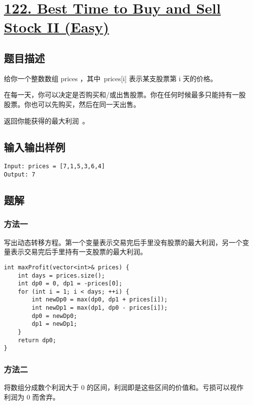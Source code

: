 \documentclass[lang=cn,10pt]{elegantbook}
\begin{document}
{\color{red}\section{\href{https://leetcode.cn/problems/best-time-to-buy-and-sell-stock-ii/}{122. Best Time to Buy and Sell Stock II (Easy)}}} \label{Ch2.122}

\subsection*{题目描述}

给你一个整数数组 prices ，其中 prices[i] 表示某支股票第 i 天的价格。

在每一天，你可以决定是否购买和/或出售股票。你在任何时候最多只能持有一股股票。你也可以先购买，然后在同一天出售。

返回你能获得的最大利润 。

\subsection*{输入输出样例}

\begin{lstlisting}
Input: prices = [7,1,5,3,6,4]
Output: 7
\end{lstlisting}

\subsection*{题解}

\subsubsection*{方法一}

写出动态转移方程。第一个变量表示交易完后手里没有股票的最大利润，另一个变量表示交易完后手里持有一支股票的最大利润。

\begin{lstlisting}
int maxProfit(vector<int>& prices) {
	int days = prices.size();
	int dp0 = 0, dp1 = -prices[0];
	for (int i = 1; i < days; ++i) {
		int newDp0 = max(dp0, dp1 + prices[i]);
		int newDp1 = max(dp1, dp0 - prices[i]);
		dp0 = newDp0;
		dp1 = newDp1;
	}
	return dp0;
}
\end{lstlisting}

\subsubsection*{方法二}

将数组分成数个利润大于 0 的区间，利润即是这些区间的价值和。亏损可以视作利润为 0 而舍弃。
\end{document}
